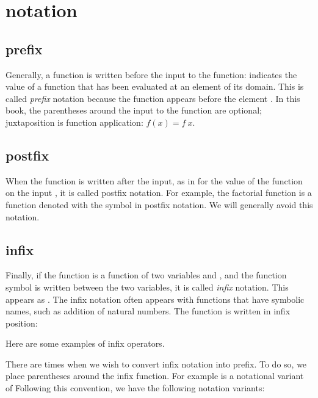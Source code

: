 \documentclass[cup9a]{cupbook}
\begin{document}
\section{notation}


\subsection{prefix}

Generally, a function is written before the input to the function:
 indicates the value of a function  that has been evaluated
at an element  of its domain.  This is called {\it prefix} notation
because the function  appears before the element .  
In this book, the parentheses around the input  to the function are optional;
juxtaposition is function application:
$f(x) = f~x$.

\subsection{postfix}

When the function is written after the input, as in  for the value of the function on the input , it is called postfix notation.  For example, the factorial function  is a function denoted with the symbol \mc{$!$} in postfix notation.   We will generally avoid this notation.

\subsection{infix}

Finally, if the function is a function of two variables  and , and the function symbol is written between the two variables, it is called {\it infix} notation.  This appears as .    The infix notation often appears with functions that have symbolic names, such as addition of natural numbers.  The function is written in infix position:

Here are some examples of infix operators.

There are times when we wish to convert infix notation into prefix.  To do so, we place parentheses around the infix function.   For example
is a notational variant of
Following this convention, we have the following notation variants:
\end{document}
